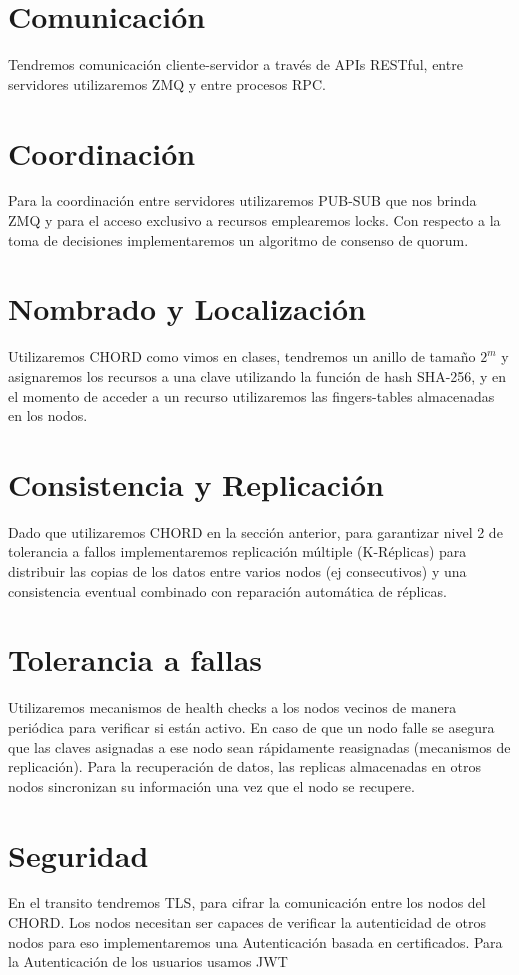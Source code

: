 \documentclass[11pt,a4paper]{article}
\begin{document}
\section{Comunicaci\'on} 

Tendremos comunicaci\'on cliente-servidor a trav\'es de APIs RESTful, entre servidores utilizaremos ZMQ y entre procesos RPC.

\section{Coordinaci\'on}

Para la coordinaci\'on entre servidores utilizaremos PUB-SUB que nos brinda ZMQ y para el acceso exclusivo a recursos emplearemos locks. Con respecto a la toma de decisiones implementaremos un algoritmo de consenso de quorum.

\section{Nombrado y Localizaci\'on} 

Utilizaremos CHORD como vimos en clases, tendremos un anillo de tamaño $2^m$ y asignaremos los recursos a una clave utilizando la funci\'on de hash SHA-256, y en el momento de acceder a un recurso utilizaremos las fingers-tables almacenadas en los nodos.

\section{Consistencia y Replicaci\'on}

Dado que utilizaremos CHORD en la secci\'on anterior, para garantizar nivel 2 de tolerancia a fallos implementaremos replicaci\'on m\'ultiple (K-R\'eplicas) para distribuir las copias de los datos entre varios nodos (ej consecutivos) y una consistencia eventual combinado con reparaci\'on autom\'atica de r\'eplicas.

\section{Tolerancia a fallas}

Utilizaremos mecanismos de health checks a los nodos vecinos de manera peri\'odica para verificar si est\'an activo. En caso de que un nodo falle se asegura que las claves asignadas a ese nodo sean r\'apidamente reasignadas (mecanismos de replicaci\'on). Para la recuperaci\'on de datos, las replicas almacenadas en otros nodos sincronizan su informaci\'on una vez que el nodo se recupere.

\section{Seguridad}

En el transito tendremos TLS, para cifrar la comunicaci\'on entre los nodos del CHORD. Los nodos necesitan ser capaces de verificar la autenticidad de otros nodos para eso implementaremos una Autenticaci\'on basada en certificados. Para la Autenticaci\'on de los usuarios usamos JWT
\end{document}
